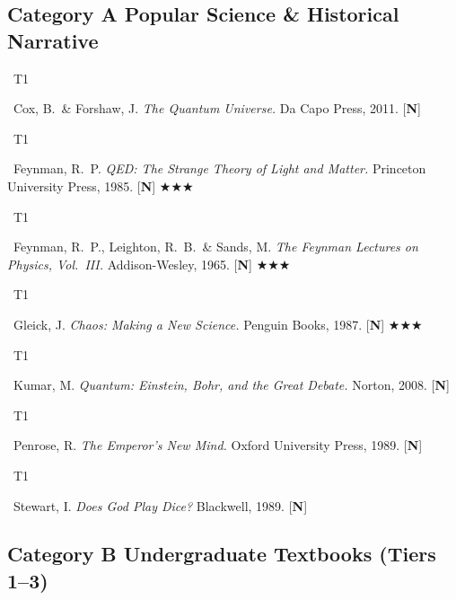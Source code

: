 \documentclass[11pt,a4paper]{article}
\newcommand{\tierbadge}[2]{%
  \colorbox{#1}{\small\bfseries\color{white}\strut\ #2\ }%
}
\newcommand{\essential}{$\bigstar\bigstar\bigstar$}
\begin{document}
\subsection*{Category A \quad Popular Science \& Historical Narrative}

\begin{tcolorbox}[catbox]
\begin{enumerate}[leftmargin=2.5em, label=\textbf{[A\arabic*]}, itemsep=5pt]
  \item \tierbadge{t1green}{T1}\ Cox, B.\ \& Forshaw, J. \textit{The Quantum Universe.} Da Capo Press, 2011. [\textbf{N}]
  \item \tierbadge{t1green}{T1}\ Feynman, R.~P. \textit{QED: The Strange Theory of Light and Matter.} Princeton University Press, 1985. [\textbf{N}] \essential
  \item \tierbadge{t1green}{T1}\ Feynman, R.~P., Leighton, R.~B.\ \& Sands, M. \textit{The Feynman Lectures on Physics, Vol.~III.} Addison-Wesley, 1965. [\textbf{N}] \essential
  \item \tierbadge{t1green}{T1}\ Gleick, J. \textit{Chaos: Making a New Science.} Penguin Books, 1987. [\textbf{N}] \essential
  \item \tierbadge{t1green}{T1}\ Kumar, M. \textit{Quantum: Einstein, Bohr, and the Great Debate.} Norton, 2008. [\textbf{N}]
  \item \tierbadge{t1green}{T1}\ Penrose, R. \textit{The Emperor's New Mind.} Oxford University Press, 1989. [\textbf{N}]
  \item \tierbadge{t1green}{T1}\ Stewart, I. \textit{Does God Play Dice?} Blackwell, 1989. [\textbf{N}]
\end{enumerate}
\end{tcolorbox}

\subsection*{Category B \quad Undergraduate Textbooks (Tiers 1--3)}
\end{document}

